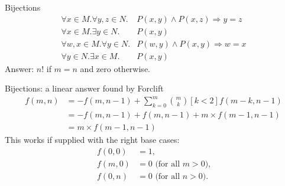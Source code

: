 \documentclass{beamer}
\begin{document}
\begin{frame}{Bijections}
  \begin{align*}
    \forall x \in M. \forall y, z \in N. &P(x, y) \land P(x, z) \Rightarrow y=z \\
    \forall x \in M. \exists y \in N. &P(x, y) \\
    \forall w, x \in M. \forall y \in N. & P(w, y) \land P(x, y) \Rightarrow w=x \\
    \forall y \in N. \exists x \in M. & P(x, y)
  \end{align*}
  Answer: $n!$ if $m=n$ and zero otherwise.
\end{frame}

\begin{frame}{Bijections: a linear answer found by Forclift}
  \begin{align*}
    f(m, n) &= - f(m, n-1) + \sum_{k=0}^m \binom{m}{k}[k < 2]f(m - k, n - 1) \\
    &= - f(m, n-1) + f(m, n - 1) + m \times f(m - 1, n - 1) \\
    &= m \times f(m - 1, n - 1)
  \end{align*}
  This works if supplied with the right base cases:
  \begin{align*}
    f(0, 0) &= 1, \\
    f(m, 0) &= 0 \text{ (for all $m > 0$),} \\
    f(0, n) &= 0 \text{ (for all $n > 0$).}
  \end{align*}
\end{frame}
\end{document}
